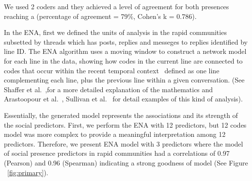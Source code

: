 \documentclass[manuscript,screen,review]{acmart}
\begin{document}
We used 2 coders and they achieved a level of agreement for both presences reaching a (percentage of agreement = 79\%, Cohen's k = 0.786). 

In the ENA, first we defined the units of analysis in the rapid communities subsetted by threads which has posts, replies and messeges to replies identified by line ID. The ENA algorithm uses a moving window to construct a network model for each line in the data, showing how codes in the current line are connected to codes that occur within the recent temporal context~\cite{siebert2017search} defined as one line complementing each line, plus the previous line within a given conversation. (See  Shaffer et al.~\cite{shaffer2016tutorial},for a more detailed explanation of the mathematics and Arastoopour et al.~\cite{arastoopour2015epistemic}, Sullivan et al.~\cite{sullivan2018using} for detail examples of this kind of analysis). 

Essentially, the generated model represents the associations and its strength of the social predictors. First, we perform the ENA with 12 predictors, but 12 codes model was more complex to provide a meaningful interpretation among 12 predictors. Therefore, we present ENA model with 3 predictors where the model of social presence predictors in rapid communities had a correlations of 0.97 (Pearson) and 0.96 (Spearman) indicating a strong goodness of model (See Figure ~\ref{fig:primary}).
\end{document}
